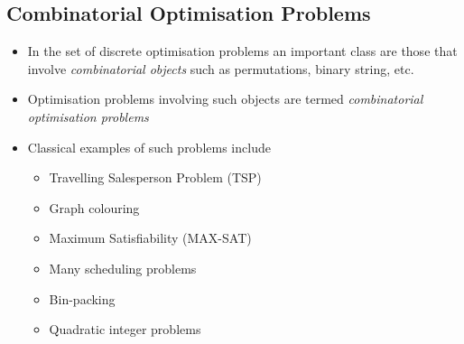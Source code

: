 
\begin{slide}
\section[-1]{Combinatorial Optimisation Problems}

\begin{PauseHighLight}
  \begin{itemize}
  \item In the set of discrete optimisation problems an important class
    are those that involve \textit{combinatorial objects} such as
    permutations, binary string, etc.\pause
  \item Optimisation problems involving such objects are termed
    \emph{combinatorial optimisation problems}\pause
  \item Classical examples of such problems include
    \begin{itemize}\squeeze
    \item Travelling Salesperson Problem (TSP)
    \item Graph colouring
    \item Maximum Satisfiability (MAX-SAT)
    \item Many scheduling problems
    \item Bin-packing
    \item Quadratic integer problems\pause
    \end{itemize}
  \end{itemize}
\end{PauseHighLight}

\end{slide}


\Outline %

